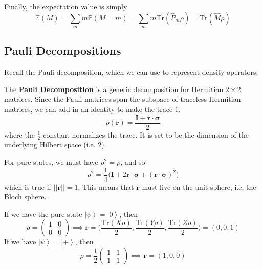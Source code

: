 \documentclass{article}
\newcommand{\ket}[1]{\ensuremath{\left|#1\right\rangle}}
\begin{document}
  \begin{lemma}
    Finally, the expectation value is simply 
    \begin{equation}
      \mathbb{E}(M) = \sum_m m \mathbb{P}(M = m) = \sum_m m \mathrm{Tr}(\hat{P}_m \rho) = \mathrm{Tr}(\hat{M} \rho)
    \end{equation}
  \end{lemma}

  \subsection{Pauli Decompositions}

    Recall the Pauli decomposition, which we can use to represent density operators. 

    \begin{definition}
      The \textbf{Pauli Decomposition} is a generic decomposition for Hermitian $2 \times 2$ matrices. Since the Pauli matrices span the subspace of traceless Hermitian matrices, we can add in an identity to make the trace $1$. 
      \begin{equation}
        \rho(\mathbf{r}) = \frac{\mathbf{I} + \mathbf{r} \cdot \boldsymbol{\sigma}}{2}
      \end{equation}
      where the $\frac{1}{2}$ constant normalizes the trace. It is set to be the dimension of the underlying Hilbert space (i.e. $2$). 
    \end{definition}

    For pure states, we must have $\rho^2 = \rho$, and so 
    \begin{equation}
      \rho^2 = \frac{1}{4} \big( \mathbf{I} + 2 \mathbf{r} \cdot \boldsymbol{\sigma} + (\mathbf{r} \cdot \boldsymbol{\sigma})^2 \big)
    \end{equation}
    which is true if $||\mathbf{r}|| = 1$. This means that $\mathbf{r}$ must live on the unit sphere, i.e. the Bloch sphere. 

    \begin{example}[Pauli Decomposition of $\ket{0}$]
      If we have the pure state $\ket{\psi} = \ket{0}$, then 
      \begin{equation}
        \rho = \begin{pmatrix} 1 & 0 \\ 0 & 0 \end{pmatrix} \implies \mathbf{r} = \bigg( \frac{\mathrm{Tr}(X \rho)}{2}, \frac{\mathrm{Tr}(Y \rho)}{2}, \frac{\mathrm{Tr}(Z \rho)}{2} \bigg) = (0, 0, 1)
      \end{equation}
      If we have $\ket{\psi} = \ket{+}$, then 
      \begin{equation}
      \rho = \frac{1}{2} \begin{pmatrix} 1 & 1 \\ 1 & 1 \end{pmatrix} \implies \mathbf{r} = (1, 0, 0)
      \end{equation}
    \end{example}
\end{document}
